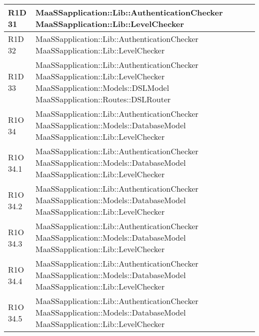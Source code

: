\begin{center}
\begin{longtable}{ | l | p{8cm} |}
    R1D 31 & MaaSSapplication::Lib::AuthenticationChecker \newline MaaSSapplication::Lib::LevelChecker \\ \hline
    
    R1D 32 & MaaSSapplication::Lib::AuthenticationChecker \newline MaaSSapplication::Lib::LevelChecker \\ \hline
        
    R1D 33 & MaaSSapplication::Lib::AuthenticationChecker \newline MaaSSapplication::Lib::LevelChecker \newline  MaaSSapplication::Models::DSLModel \newline MaaSSapplication::Routes::DSLRouter \\ \hline
    
    R1O 34 & MaaSSapplication::Lib::AuthenticationChecker \newline  MaaSSapplication::Models::DatabaseModel \newline MaaSSapplication::Lib::LevelChecker \\ \hline
      	
   	R1O 34.1 & MaaSSapplication::Lib::AuthenticationChecker \newline  MaaSSapplication::Models::DatabaseModel \newline MaaSSapplication::Lib::LevelChecker \\ \hline
   	
   	R1O 34.2 & MaaSSapplication::Lib::AuthenticationChecker \newline  MaaSSapplication::Models::DatabaseModel \newline MaaSSapplication::Lib::LevelChecker \\ \hline
   	
   	R1O 34.3 & MaaSSapplication::Lib::AuthenticationChecker \newline  MaaSSapplication::Models::DatabaseModel \newline MaaSSapplication::Lib::LevelChecker \\ \hline
     	
    R1O 34.4 & MaaSSapplication::Lib::AuthenticationChecker \newline  MaaSSapplication::Models::DatabaseModel \newline MaaSSapplication::Lib::LevelChecker \\ \hline
    
    R1O 34.5 & MaaSSapplication::Lib::AuthenticationChecker \newline  MaaSSapplication::Models::DatabaseModel \newline MaaSSapplication::Lib::LevelChecker \\ \hline
    

\end{longtable}
\end{center}
